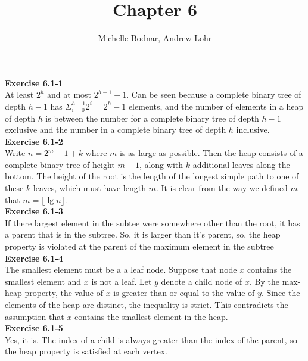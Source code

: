 \documentclass{article}
\title{Chapter 6}
\author{Michelle Bodnar, Andrew Lohr}
\begin{document}
\maketitle

\noindent\textbf{Exercise 6.1-1}\\

At least $2^h$ and at most $2^{h+1}-1$. Can be seen because a complete binary tree of depth $h-1$ has $\Sigma_{i=0}^{h-1} 2^i = 2^h-1$ elements, and the number of elements in a heap of depth $h$ is between the number for a complete binary tree of depth $h-1$ exclusive and the number in a complete binary tree of depth $h$ inclusive.\\

\noindent\textbf{Exercise 6.1-2}\\

Write $n = 2^m-1 + k$ where $m$ is as large as possible.  Then the heap consists of a complete binary tree of height $m-1$, along with $k$ additional leaves along the bottom. The height of the root is the length of the longest simple path to one of these $k$ leaves, which must have length $m$.  It is clear from the way we defined $m$ that $m = \lfloor \lg n \rfloor$. \\

\noindent\textbf{Exercise 6.1-3}\\

If there largest element in the subtee were somewhere other than the root, it has a parent that is in the subtree. So, it is larger than it's parent, so, the heap property is violated at the parent of the maximum element in the subtree\\

\noindent\textbf{Exercise 6.1-4}\\

The smallest element must be a a leaf node.  Suppose that node $x$ contains the smallest element and $x$ is not a leaf.  Let $y$ denote a child node of $x$.  By the max-heap property, the value of $x$ is greater than or equal to the value of $y$.  Since the elements of the heap are distinct, the inequality is strict.  This contradicts the assumption that $x$ contains the smallest element in the heap. \\


\noindent\textbf{Exercise 6.1-5}\\

Yes, it is. The index of a child is always greater than the index of the parent, so the heap property is satisfied at each vertex.\\
\end{document}
